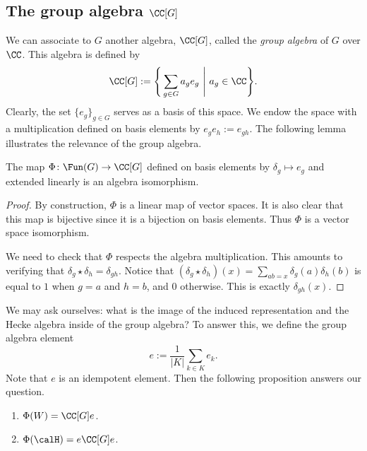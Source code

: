 \subsection{The group algebra $\CC[G]$}\label{Section1.4}
We can associate to $G$ another algebra, $\CC[G]$, called the \emph{group algebra} of $G$ over $\CC$.
This algebra is defined by
\[
    \CC[G] := \Bigg\{ \sum_{g\in G} a_g e_g\ \Bigg|\ a_g\in \CC \Bigg\}.
\]
Clearly, the set $\{e_g\}_{g\in G}$ serves as a basis of this space.
We endow the space with a multiplication defined on basis elements by $e_ge_h := e_{gh}$.
The following lemma illustrates the relevance of the group algebra.
\begin{lem}
    The map $\Phi\colon \Fun(G)\to\CC[G]$ defined on basis elements by $\delta_g\mapsto e_g$ and extended linearly is an algebra isomorphism.
\end{lem}
\begin{proof}
    By construction, $\Phi$ is a linear map of vector spaces.
    It is also clear that this map is bijective since it is a bijection on basis elements.
    Thus $\Phi$ is a vector space isomorphism.

    We need to check that $\Phi$ respects the algebra multiplication.
    This amounts to verifying that $\delta_g \star \delta_h = \delta_{gh}$.
    Notice that $(\delta_g\star\delta_h)(x) = \sum_{ab=x} \delta_g(a)\delta_h(b)$ is equal to $1$ when $g=a$ and $h=b$, and $0$ otherwise.
    This is exactly $\delta_{gh}(x)$.
\end{proof}
We may ask ourselves: what is the image of the induced representation and the Hecke algebra inside of the group algebra? To answer this, we define the group algebra element
\[
    e := \frac{1}{|K|} \sum_{k\in K} e_k.
\]
Note that $e$ is an idempotent element.
Then the following proposition answers our question.
\begin{prop}
    \begin{enumerate}[\itshape(i)]
        \item $\Phi(W) = \CC[G]e$.
        \item $\Phi(\calH) = e \CC[G] e$.
    \end{enumerate}
\end{prop}
